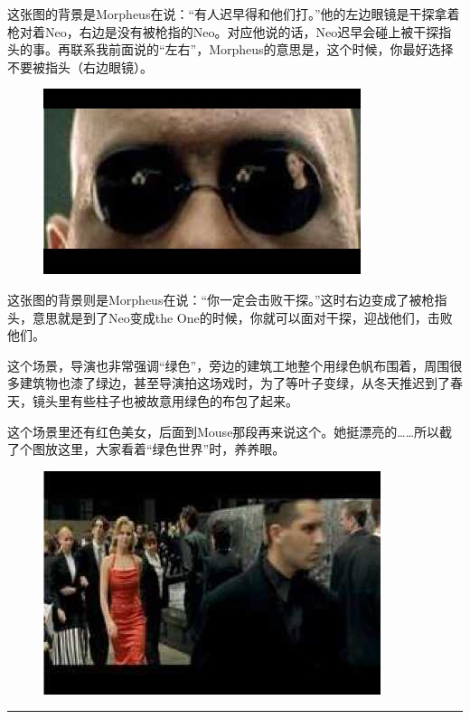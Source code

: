 \documentclass[UTF8]{ctexart}
\newcommand{\myparsep}{\noindent \rule[0.5ex]{\linewidth}{1pt}}
\begin{document}
这张图的背景是Morpheus在说：“有人迟早得和他们打。”他的左边眼镜是干探拿着枪对着Neo，右边是没有被枪指的Neo。对应他说的话，Neo迟早会碰上被干探指头的事。再联系我前面说的“左右”，Morpheus的意思是，这个时候，你最好选择不要被指头（右边眼镜）。

\begin{figure}[htb]
\centering
\includegraphics[width=0.5\linewidth]{fig/read_Matrix-35}
\end{figure}

这张图的背景则是Morpheus在说：“你一定会击败干探。”这时右边变成了被枪指头，意思就是到了Neo变成the One的时候，你就可以面对干探，迎战他们，击败他们。

这个场景，导演也非常强调“绿色”，旁边的建筑工地整个用绿色帆布围着，周围很多建筑物也漆了绿边，甚至导演拍这场戏时，为了等叶子变绿，从冬天推迟到了春天，镜头里有些柱子也被故意用绿色的布包了起来。

这个场景里还有红色美女，后面到Mouse那段再来说这个。她挺漂亮的……所以截了个图放这里，大家看着“绿色世界”时，养养眼。

\begin{figure}[htb]
\centering
\includegraphics[width=0.5\linewidth]{fig/read_Matrix-36}
\end{figure}

\myparsep
\end{document}
